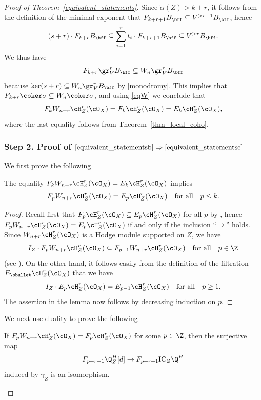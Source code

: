 \begin{proof}[Proof of Theorem~\ref{equivalent_statements}]
Since $\widetilde\alpha(Z)>k+r$, it follows from the definition of the minimal exponent that
$F_{k+r+1}B_\bff\subseteq V^{>r-1}B_\bff$, hence
\[
(s+r)\cdot F_{k+r}B_\bff \subseteq \sum^r_{i=1} t_i \cdot F_{k+r+1} B_\bff \subseteq V^{>r} B_\bff.
\]
We thus have
\begin{equation}\label{eq:ab2}
F_{k+r}\gr^r_V B_\bff \subseteq W_n\gr^r_V B_\bff
\end{equation}
because $\ker(s+r)\subseteq W_n\gr^r_VB_\bff$ by \eqref{monodromy}.
This implies that $F_{k+r}\coker\sigma\subseteq W_n\coker \sigma$, and using \eqref{eqW}
we conclude that
\[F_kW_{n+r}\cH^r_Z(\cO_X)=F_k\cH_Z^r(\cO_X)=E_k\cH^r_Z(\cO_X),\]
where the last equality follows from Theorem~\ref{thm_local_coho}.

\subsubsection*{Step 2. Proof of $\eqref{equivalent_statementsb}\Rightarrow\eqref{equivalent_statementsc}$}
We first prove the following

\begin{lem}\label{lem:6}
The equality $F_k W_{n+r}\cH^r_Z(\cO_X)=E_k \cH^r_Z(\cO_X)$ implies
\[
F_p W_{n+r}\cH^r_Z(\cO_X)=E_p \cH^r_Z(\cO_X) \quad \text{for all} \quad p\leq k.
\]
\end{lem}

\begin{proof}
Recall first that $F_p\cH^r_Z(\cO_X)\subseteq E_p\cH^r_Z(\cO_X)$ for all $p$ by \cite[Prop.\,3.4]{MP1},
hence $F_p W_{n+r}\cH^r_Z(\cO_X)=E_p \cH^r_Z(\cO_X)$ if and only if the inclusion ``$\supseteq$'' holds.
Since $W_{n+r}\cH^r_Z(\cO_X)$ is a Hodge module supported on $Z$, we have
\[
I_Z \cdot F_p W_{n+r}\cH^r_Z(\cO_X) \subseteq F_{p-1} W_{n+r}\cH^r_Z(\cO_X)\quad\text{for all}\quad p\in\Z
\]
(see \cite[Lem.\,3.2.6]{Saito_MHP}).
On the other hand, it follows easily from the definition of the filtration $E_{\sbullet}\cH_Z^r(\cO_X)$ that we have
\[
I_Z\cdot E_p\cH^r_Z(\cO_X)=E_{p-1}\cH^r_Z(\cO_X)\quad\text{for all}\quad p\geq 1.
\]
The assertion in the lemma now follows by decreasing induction on $p$.
\end{proof}

We next use duality to prove the following

\begin{lem}\label{lem:dualfw}
If $F_pW_{n+r}\cH^r_Z(\cO_X)=F_p \cH^r_Z(\cO_X)$ for some $p\in \Z$, then the surjective map
\[
F_{p+r+1}\Q_Z^H[d] \to F_{p+r+1}\mathrm{IC}_Z\Q^H
\]
induced by $\gamma_Z$ is an isomorphism.
\end{lem}


\end{proof}
